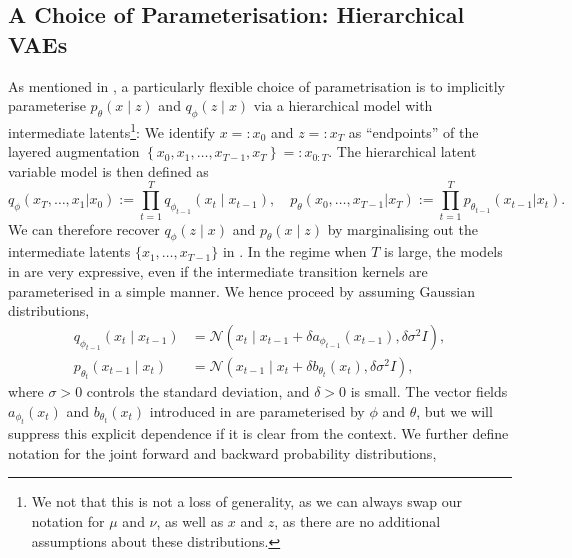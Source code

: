 \subsection{A Choice of Parameterisation: Hierarchical VAEs}

As mentioned in , a particularly flexible choice of parametrisation is to implicitly parameterise $p_{\theta}(x \mid z)$ and $q_{\phi}(z \mid x)$ via a hierarchical model with intermediate latents\footnote{We not that this is not a loss of generality, as we can always swap our notation for $\mu$ and $\nu$, as well as $x$ and $z$, as there are no additional assumptions about these distributions.}: We identify $x=: x_0$ and $z=: x_T$ as ``endpoints'' of the layered augmentation $\left\{x_0, x_1, \ldots, x_{T-1}, x_T\right\}=: x_{0: T}$. The hierarchical latent variable model is then defined as
\[
    q_{\phi}\left(x_T, \ldots, x_1 | x_0\right) := \prod_{t=1}^T q_{\phi_{t-1}}\left(x_t \mid x_{t-1}\right), \quad p_\theta\left(x_0, \ldots, x_{T-1} | x_T\right):=\prod_{t=1}^T p_{\theta_{t-1}}\left(x_{t-1} | x_t\right). \label{eq:hierarchical_latent}
\]
We can therefore recover $q_{\phi}(z \mid x)$ and $p_{\theta}(x \mid z)$ by marginalising out the intermediate latents $\{x_1, \ldots, x_{T-1}\}$ in . In the regime when $T$ is large, the models in  are very expressive, even if the intermediate transition kernels are parameterised in a simple manner. We hence proceed by assuming Gaussian distributions,\label{ntn:gaussian_latents}
\begin{subequations}
\begin{align}
q_{\phi_{t-1}}\left(x_t \mid x_{t-1}\right) &= \mathcal{N}\left(x_t \mid x_{t-1}+\delta a_{\phi_{t-1}}\left(x_{t-1}\right), \delta \sigma^2 I\right), \label{eq:gaussian_fwd}\\
p_{\theta_t}\left(x_{t-1} \mid x_t\right) &= \mathcal{N}\left(x_{t-1} \mid x_t+\delta b_{\theta_t}\left(x_t\right), \delta \sigma^2 I\right), \label{eq:gaussian_rev}
\end{align}
\end{subequations}
where $\sigma>0$ controls the standard deviation, and $\delta>0$ is small\label{ntn:std_dev_gaussian_latent}\label{ntn:small_delta}. The vector fields $a_{\phi_t}\left(x_t\right)$ and $b_{\theta_t}\left(x_t\right)$ introduced in  are parameterised by $\phi$ and $\theta$, but we will suppress this explicit dependence if it is clear from the context\label{ntn:vector_fields}. We further define notation for the joint forward and backward probability distributions,
